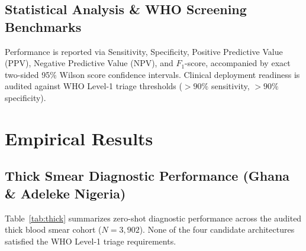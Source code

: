 \documentclass[a4paper,11pt]{article}
\begin{document}
\subsection{Statistical Analysis \& WHO Screening Benchmarks}
Performance is reported via Sensitivity, Specificity, Positive Predictive Value (PPV), Negative Predictive Value (NPV), and $F_1$-score, accompanied by exact two-sided 95\% Wilson score confidence intervals. Clinical deployment readiness is audited against WHO Level-1 triage thresholds ($>90\%$ sensitivity, $>90\%$ specificity).

\section{Empirical Results}
\label{sec:results}

\subsection{Thick Smear Diagnostic Performance (Ghana \& Adeleke Nigeria)}
Table~\ref{tab:thick} summarizes zero-shot diagnostic performance across the audited thick blood smear cohort ($N = 3,902$). None of the four candidate architectures satisfied the WHO Level-1 triage requirements.

\begin{table}[htbp]
\centering
\small
\caption{Diagnostic performance on Audited Thick Blood Smear Cohort ($N = 3,902$, post-quarantine).}
\label{tab:thick}
\end{table}
\end{document}
